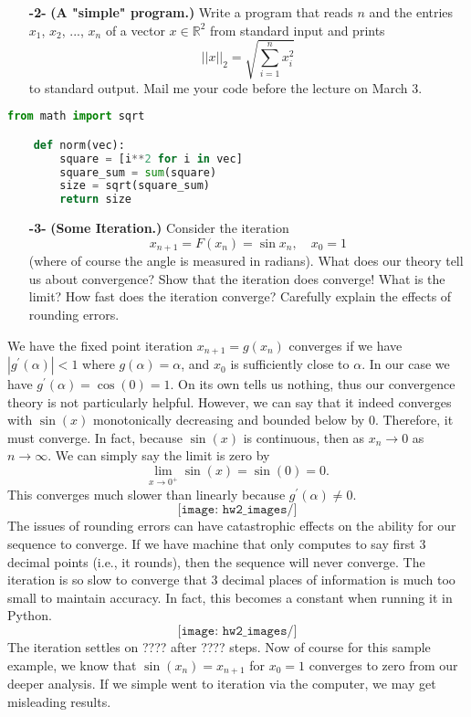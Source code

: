 \documentclass[11pt]{article}
\theoremstyle{definition}
\newcommand{\R}{\mathbb{R}}
\newcommand{\1}[1]{\mathbf{1} \left \{ #1 \right \}}
\begin{document}
\begin{itemize}
    \item[{\textbf{-2-}}] \textbf{(A "simple" program.)}  Write a program that reads $n$ and the entries $x_1$, $x_2$, ..., $x_n$ of a vector $x \in \R^2$ from standard input and prints
    \begin{equation*}
        ||x||_2 = \sqrt{\sum_{i=1}^n x_i^2}
    \end{equation*}
    to standard output.  Mail me your code before the lecture on March 3.
\end{itemize}
\begin{lstlisting}[language=Python]
    from math import sqrt

    def norm(vec):
        square = [i**2 for i in vec]
        square_sum = sum(square)
        size = sqrt(square_sum)
        return size
\end{lstlisting}

\begin{itemize}
    \item[{\textbf{-3-}}] \textbf{(Some Iteration.)}  Consider the iteration
    \begin{equation}
        x_{n+1} = F(x_n) = \sin x_n, \quad x_0 = 1
    \end{equation}
    (where of course the angle is measured in radians).  What does our theory tell us about convergence? Show that the iteration does converge!  What is the limit?  How fast does the iteration converge?  Carefully explain the effects of rounding errors.
\end{itemize}
We have the fixed point iteration $x_{n+1} = g(x_n)$ converges if we have \(\left|g^{\prime} (\alpha)\right| < 1\) where $g(\alpha) = \alpha$, and $x_0$ is sufficiently close to $\alpha$.  In our case we have $g^{\prime} (\alpha) = \cos (0) = 1$.  On its own tells us nothing, thus our convergence theory is not particularly helpful.  However, we can say that it indeed converges with $\sin (x)$ monotonically decreasing and bounded below by $0$.  Therefore, it must converge.  In fact, because $\sin (x)$ is continuous, then as $x_n \rightarrow 0$ as $n \rightarrow \infty$.  We can simply say the limit is zero by
\[\lim_{x \rightarrow 0^+} \sin (x) = \sin (0) = 0.\]
This converges much slower than linearly because $g^{\prime} (\alpha) \neq 0$.
\[\texttt{[image: hw2\_images/]}\]
The issues of rounding errors can have catastrophic effects on the ability for our sequence to converge.  If we have machine that only computes to say first $3$ decimal points (i.e., it rounds), then the sequence will never converge.  The iteration is so slow to converge that $3$ decimal places of information is much too small to maintain accuracy.  In fact, this becomes a constant when running it in Python.
\[\texttt{[image: hw2\_images/]}\]
The iteration settles on ???? after ???? steps.  Now of course for this sample example, we know that $\sin (x_n) = x_{n+1}$ for $x_0 = 1$ converges to zero from our deeper analysis.  If we simple went to iteration via the computer, we may get misleading results.
\end{document}
